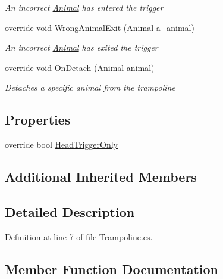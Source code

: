 \begin{DoxyCompactItemize}
\begin{DoxyCompactList}\small\item\em An incorrect \mbox{\hyperlink{class_animal}{Animal}} has entered the trigger \end{DoxyCompactList}\item 
override void \mbox{\hyperlink{class_trampoline_ac7806793d08278aafaac93d0ac552e51}{Wrong\+Animal\+Exit}} (\mbox{\hyperlink{class_animal}{Animal}} a\+\_\+animal)
\begin{DoxyCompactList}\small\item\em An incorrect \mbox{\hyperlink{class_animal}{Animal}} has exited the trigger \end{DoxyCompactList}\item 
override void \mbox{\hyperlink{class_trampoline_a2bb01ad135e9dfe5ad5685aaea9936c9}{On\+Detach}} (\mbox{\hyperlink{class_animal}{Animal}} animal)
\begin{DoxyCompactList}\small\item\em Detaches a specific animal from the trampoline \end{DoxyCompactList}\end{DoxyCompactItemize}
\subsection*{Properties}
\begin{DoxyCompactItemize}
\item 
override bool \mbox{\hyperlink{class_trampoline_a7888515923868cf96a0f0bb60b318b63}{Head\+Trigger\+Only}}
\end{DoxyCompactItemize}
\subsection*{Additional Inherited Members}


\subsection{Detailed Description}


Definition at line 7 of file Trampoline.\+cs.



\subsection{Member Function Documentation}
\mbox{\label{class_trampoline_a88fb0d537bb19917501307544d3e50b5}} 
